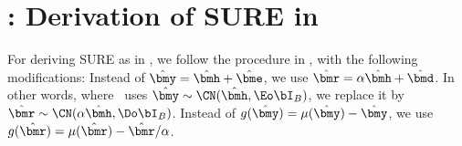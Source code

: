 
 \label{app:sand_sure}
\section*{: Derivation of SURE in } 

For deriving SURE as in , we follow the procedure in \cite[App.~A]{ghods19a}, with the following modifications: Instead of $\yhat = \hhat+\ehat$, we use $\rhat = \alpha\hhat + \dhat$. In other words, where~\cite{ghods19a} uses $\yhat\sim\CN(\hhat,\Eo\bI_B)$, we replace it by $\rhat\sim\CN(\alpha\hhat,\Do\bI_B)$. Instead of $g(\yhat) = \mu(\yhat) - \yhat$, we use $g(\rhat) = \mu(\rhat) - \rhat/\alpha$.

